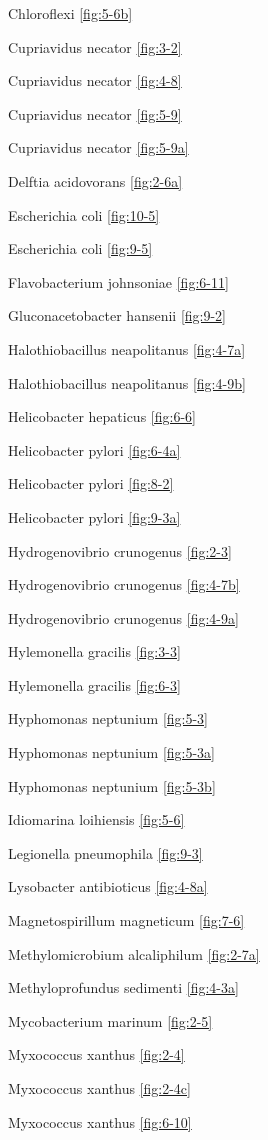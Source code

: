 \documentclass[]{tufte-book}
\begin{document}
Chloroflexi \ref{fig:5-6b}

Cupriavidus necator \ref{fig:3-2}

Cupriavidus necator \ref{fig:4-8}

Cupriavidus necator \ref{fig:5-9}

Cupriavidus necator \ref{fig:5-9a}

Delftia acidovorans \ref{fig:2-6a}

Escherichia coli \ref{fig:10-5}

Escherichia coli \ref{fig:9-5}

Flavobacterium johnsoniae \ref{fig:6-11}

Gluconacetobacter hansenii \ref{fig:9-2}

Halothiobacillus neapolitanus \ref{fig:4-7a}

Halothiobacillus neapolitanus \ref{fig:4-9b}

Helicobacter hepaticus \ref{fig:6-6}

Helicobacter pylori \ref{fig:6-4a}

Helicobacter pylori \ref{fig:8-2}

Helicobacter pylori \ref{fig:9-3a}

Hydrogenovibrio crunogenus \ref{fig:2-3}

Hydrogenovibrio crunogenus \ref{fig:4-7b}

Hydrogenovibrio crunogenus \ref{fig:4-9a}

Hylemonella gracilis \ref{fig:3-3}

Hylemonella gracilis \ref{fig:6-3}

Hyphomonas neptunium \ref{fig:5-3}

Hyphomonas neptunium \ref{fig:5-3a}

Hyphomonas neptunium \ref{fig:5-3b}

Idiomarina loihiensis \ref{fig:5-6}

Legionella pneumophila \ref{fig:9-3}

Lysobacter antibioticus \ref{fig:4-8a}

Magnetospirillum magneticum \ref{fig:7-6}

Methylomicrobium alcaliphilum \ref{fig:2-7a}

Methyloprofundus sedimenti \ref{fig:4-3a}

Mycobacterium marinum \ref{fig:2-5}

Myxococcus xanthus \ref{fig:2-4}

Myxococcus xanthus \ref{fig:2-4c}

Myxococcus xanthus \ref{fig:6-10}
\end{document}
